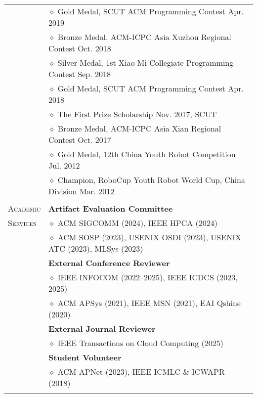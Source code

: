 \documentclass[letterpaper, 12pt]{article}
\begin{document}
\begin{longtable}{p{1.0in}p{5.8in}}
& $\diamond$ Gold Medal, SCUT ACM Programming Contest \hfill Apr. 2019 \\

& $\diamond$ Bronze Medal, ACM-ICPC Asia Xuzhou Regional Contest \hfill Oct. 2018 \\

& $\diamond$ Silver Medal, 1st Xiao Mi Collegiate Programming Contest \hfill Sep. 2018 \\

& $\diamond$ Gold Medal, SCUT ACM Programming Contest \hfill Apr. 2018 \\

& $\diamond$ The First Prize Scholarship \hfill Nov. 2017, SCUT \\

& $\diamond$ Bronze Medal, ACM-ICPC Asia Xian Regional Contest \hfill Oct. 2017 \\

& $\diamond$ Gold Medal, 12th China Youth Robot Competition \hfill Jul. 2012 \\

& $\diamond$ Champion, RoboCup Youth Robot World Cup, China Division \hfill Mar. 2012 \\

& \\

{\textsc{Academic}}
& \textbf{Artifact Evaluation Committee} \\
{\textsc{Services}}
& $\diamond$ ACM SIGCOMM (2024), IEEE HPCA (2024) \\
& $\diamond$ ACM SOSP (2023), USENIX OSDI (2023), USENIX ATC (2023), MLSys (2023) \\
& \textbf{External Conference Reviewer} \\
& $\diamond$ IEEE INFOCOM (2022--2025), IEEE ICDCS (2023, 2025) \\
& $\diamond$ ACM APSys (2021), IEEE MSN (2021), EAI Qshine (2020) \\
& \textbf{External Journal Reviewer} \\
& $\diamond$ IEEE Transactions on Cloud Computing (2025) \\
& \textbf{Student Volunteer} \\
& $\diamond$ ACM APNet (2023), IEEE ICMLC \& ICWAPR (2018) \\
& \\


\end{longtable}
\end{document}
